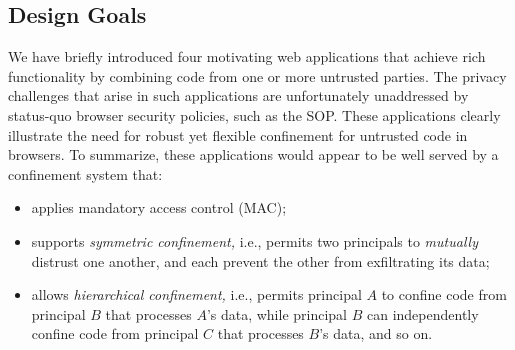 \subsection{Design Goals}

We have briefly introduced four motivating web applications that
achieve rich functionality by combining code from one or more
untrusted parties. The privacy challenges that arise in such
applications are unfortunately unaddressed by status-quo browser
security policies, such as the SOP. These applications clearly
illustrate the need for robust yet flexible confinement for untrusted
code in browsers. To summarize, these applications would appear to be
well served by a confinement system that:

\begin{itemize}
\item applies mandatory access control (MAC);
\item supports {\em symmetric confinement,} i.e., permits two principals to {\em
    mutually} distrust one another, and each prevent the other from
  exfiltrating its data;
\item allows {\em hierarchical confinement,} i.e., permits principal
  $A$ to confine code from principal $B$ that processes $A$'s data,
  while principal $B$ can independently confine code from principal
  $C$ that processes $B$'s data, and so on.
\end{itemize}
